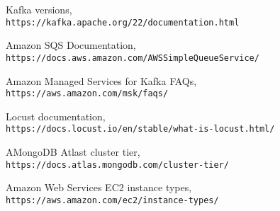 \documentclass{IEEEtran}
\begin{document}
% 
% 
\begin{thebibliography}{9}
Kafka versions,
\\\texttt{https://kafka.apache.org/22/documentation.html}

Amazon SQS Documentation,
\\\texttt{https://docs.aws.amazon.com/AWSSimpleQueueService/}

Amazon Managed Services for Kafka FAQs,
\\\texttt{https://aws.amazon.com/msk/faqs/}

Locust documentation,
\\\texttt{https://docs.locust.io/en/stable/what-is-locust.html/}

AMongoDB Atlast cluster tier,
\\\texttt{https://docs.atlas.mongodb.com/cluster-tier/}

Amazon Web Services EC2 instance types,
\\\texttt{https://aws.amazon.com/ec2/instance-types/}

\end{thebibliography}

%
%

\end{document}
